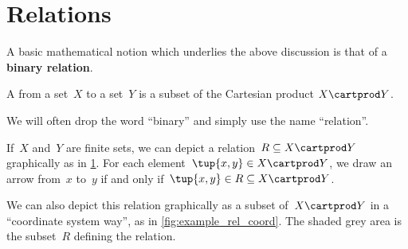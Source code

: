 

\section{Relations}
\label{sec:connection-relations}

A basic mathematical notion which underlies the above discussion is that of a \textbf{binary relation}.

\begin{definition}
  \label{def:binary-relation}
  A \emph{} from a set~$X$ to a set~$Y$ is a subset of the Cartesian product $X\cartprod Y$.
\end{definition}

\begin{remark}
  We will often drop the word ``binary'' and simply use the name ``relation''.
\end{remark}


If~$X$ and~$Y$ are finite sets, we can depict a relation~$R \subseteq X \cartprod Y$ graphically as in \cref{fig:example_rel}. For each element~$\tup{x,y} \in X \cartprod Y$, we draw an arrow from~$x$ to~$y$ if and only if~$\tup{x,y} \in R \subseteq X \cartprod Y$.

\begin{figure}[h!]
  \centering
  \caption{\label{fig:example_rel}}
\end{figure}

We can also depict this relation graphically as a subset of~$X \cartprod Y$ in a ``coordinate system way'', as in \cref{fig:example_rel_coord}. The shaded grey area is the subset~$R$ defining the relation.
%

